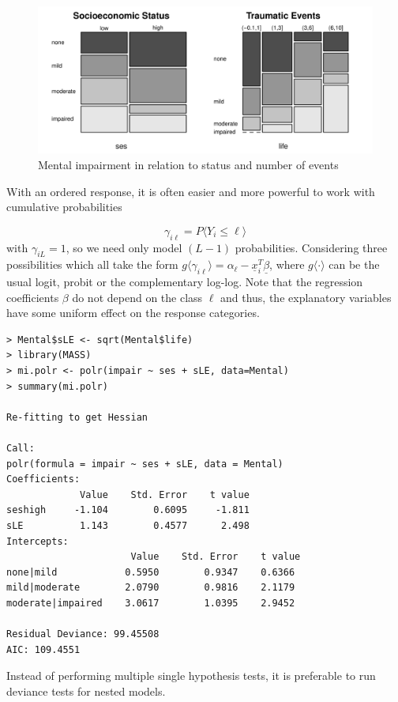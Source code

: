 \documentclass[11pt]{article}
\begin{document}
\begin{figure}[tbh]
	\centering
	\includegraphics[width=0.8\linewidth, keepaspectratio]{img/mental_impairment}
	\caption{Mental impairment in relation to status and number of events}
	\label{fig:mentalimpairment}
\end{figure}

With an ordered response, it is often easier and more powerful to work with cumulative probabilities

\begin{equation*}
	\gamma_{i\ell} = P\langle Y_i\leq\ell\rangle
\end{equation*}
with $\gamma_{iL} = 1$, so we need only model $(L-1)$ probabilities.
Considering three possibilities which all take the form $g\langle\gamma_{i\ell}\rangle = \alpha_\ell - \underline{x}_i^T\underline{\beta}$, where $g\langle \cdot \rangle$ can be the usual logit, probit or the complementary log-log. Note that the regression coefficients $\beta$ do not depend on the class $\ell$ and thus, the explanatory variables have some uniform effect on the response categories.

\begin{verbatim}
> Mental$sLE <- sqrt(Mental$life)
> library(MASS)
> mi.polr <- polr(impair ~ ses + sLE, data=Mental)
> summary(mi.polr)

Re-fitting to get Hessian

Call:
polr(formula = impair ~ ses + sLE, data = Mental)
Coefficients:
             Value    Std. Error    t value
seshigh     -1.104        0.6095     -1.811
sLE          1.143        0.4577      2.498
Intercepts:
                      Value    Std. Error    t value
none|mild            0.5950        0.9347    0.6366
mild|moderate        2.0790        0.9816    2.1179
moderate|impaired    3.0617        1.0395    2.9452

Residual Deviance: 99.45508
AIC: 109.4551
\end{verbatim}

Instead of performing multiple single hypothesis tests, it is preferable to run deviance tests for nested models.
\end{document}
